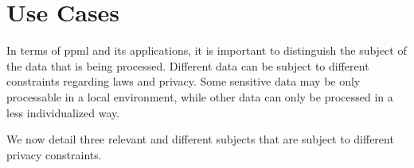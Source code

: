 
\section{Use Cases}
\label{sec:UseCases}


In terms of \ac{ppml} and its applications, it is important to distinguish the subject of the data that is being processed. Different data can be subject to different constraints regarding laws and privacy. Some sensitive data may be only processable in a local environment, while other data can only be processed in a less individualized way.

We now detail three relevant and different subjects that are subject to different privacy constraints.


